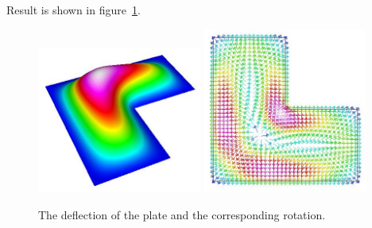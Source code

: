 Result is shown in figure~\ref{fig:simplePlateDeflection}.
%
\begin{figure}[tbhp]
\begin{center}
\includegraphics[width=0.48\textwidth]{simplePlateDeflection}
\includegraphics[width=0.48\textwidth]{simplePlateRotation}
\end{center}
\caption{The deflection of the plate and the corresponding rotation.}
\label{fig:simplePlateDeflection}
\end{figure}
%

